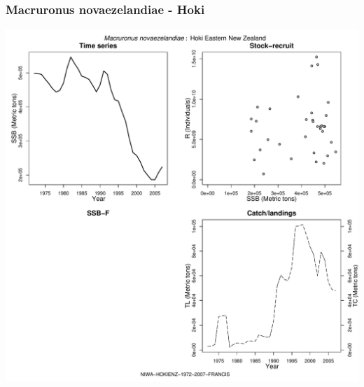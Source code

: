 \subsubsection{Macruronus novaezelandiae - Hoki}
\begin{center}
\includegraphics[width=1.2\textwidth]{../R/figures/NIWA-HOKIENZ-1972-2007-FRANCIS.pdf}
\end{center}

